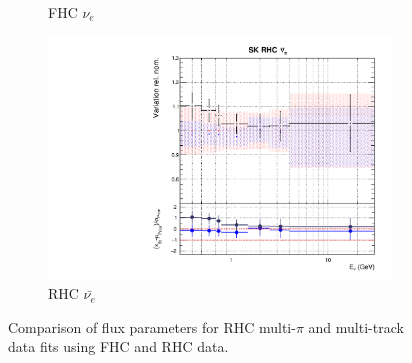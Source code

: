 \begin{figure}[t]
\begin{subfigure}{0.42\textwidth}
  \caption{\SK FHC $\nu_{e}$}
\end{subfigure}
\begin{subfigure}{0.42\textwidth}
  \centering
  \includegraphics[width=0.75\linewidth]{figs/rhcmpdat28flux_15}
  \caption{\SK RHC $\bar{\nu_{e}}$}
\end{subfigure}
\caption{Comparison of \SK flux parameters for RHC multi-$\pi$ and multi-track data fits using FHC and RHC data.}
\label{fig:rhcmpidat28SK}
\end{figure}

